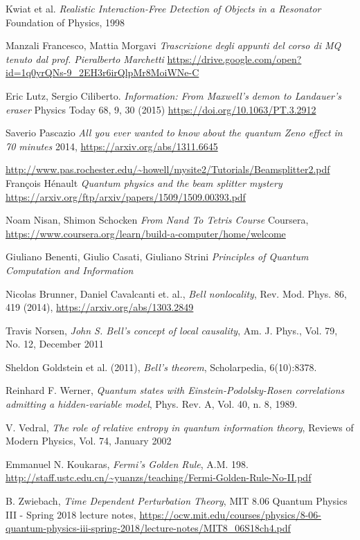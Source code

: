 \documentclass[12pt]{report} %
\DeclareRobustCommand{\MQ}{{\small\textsc{MQ}}\xspace}
\theoremstyle{plain}
\theoremstyle{definition}
\theoremstyle{remark}
\begin{document}
\clearpage
\begin{thebibliography}{9}
Kwiat et al.
\textit{Realistic Interaction-Free Detection of Objects in a Resonator}
Foundation of Physics, 1998

Manzali Francesco, Mattia Morgavi
\textit{Trascrizione degli appunti del corso di \MQ tenuto dal prof. Pieralberto Marchetti}
\url{https://drive.google.com/open?id=1q0yrQNs-9_2EH3r6irQlpMr8MoiWNe-C}

Eric Lutz, Sergio Ciliberto.
\textit{Information: From Maxwell’s demon to Landauer’s eraser}
Physics Today 68, 9, 30 (2015) \url{https://doi.org/10.1063/PT.3.2912}

Saverio Pascazio
\textit{All you ever wanted to know about the quantum Zeno effect in 70 minutes}
2014, \url{https://arxiv.org/abs/1311.6645}

\url{http://www.pas.rochester.edu/~howell/mysite2/Tutorials/Beamsplitter2.pdf}
François Hénault
\textit{Quantum physics and the beam splitter mystery}
\url{https://arxiv.org/ftp/arxiv/papers/1509/1509.00393.pdf}

Noam Nisan, Shimon Schocken
\textit{From Nand To Tetris Course}
Coursera, \url{https://www.coursera.org/learn/build-a-computer/home/welcome}

Giuliano Benenti, Giulio Casati, Giuliano Strini
\textit{Principles of Quantum Computation and Information}

Nicolas Brunner, Daniel Cavalcanti et. al., \textit{Bell nonlocality}, Rev. Mod. Phys. 86, 419 (2014), \url{https://arxiv.org/abs/1303.2849}

Travis Norsen, 
\textit{John S. Bell’s concept of local causality},  Am. J. Phys., Vol. 79, No. 12, December 2011

Sheldon Goldstein et al. (2011), \textit{Bell's theorem}, 
Scholarpedia, 6(10):8378.

Reinhard F. Werner, \textit{Quantum states with Einstein-Podolsky-Rosen correlations admitting a hidden-variable model}, Phys. Rev. A, Vol. 40, n. 8, 1989.

V. Vedral, \textit{The role of relative entropy in quantum information theory}, Reviews of Modern Physics, Vol. 74, January 2002

Emmanuel N. Koukaras, \textit{Fermi's Golden Rule}, A.M. 198. \url{http://staff.ustc.edu.cn/~yuanzs/teaching/Fermi-Golden-Rule-No-II.pdf}

B. Zwiebach, \textit{Time Dependent Perturbation Theory}, MIT 8.06 Quantum Physics III - Spring 2018 lecture notes, \url{https://ocw.mit.edu/courses/physics/8-06-quantum-physics-iii-spring-2018/lecture-notes/MIT8_06S18ch4.pdf}
\end{thebibliography}

\printindex
\end{document}
